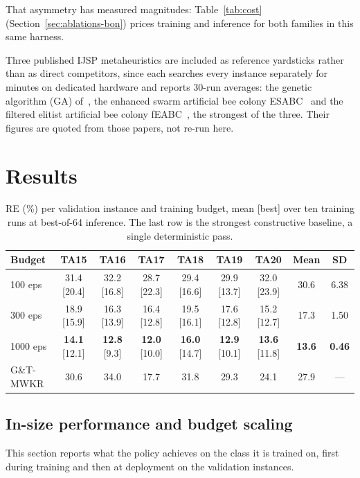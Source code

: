 \documentclass[preprint,12pt]{elsarticle}
\theoremstyle{definition}
\theoremstyle{remark}
\begin{document}
That asymmetry has measured magnitudes: Table~\ref{tab:cost}
(Section~\ref{sec:ablations-bon}) prices training and inference for
both families in this same harness.

Three published IJSP metaheuristics are included as reference
yardsticks rather than as direct competitors, since each searches
every instance separately for minutes on dedicated hardware and
reports 30-run averages: the genetic algorithm (GA)
of~\citet{DiazGA2020}, the enhanced swarm artificial bee colony
ESABC~\citep{DiazICAE2023} and the filtered elitist artificial bee
colony fEABC~\citep{DiazFEABC2023}, the strongest of the three. Their
figures are quoted from those papers, not re-run here.

\section{Results}
\label{sec:results}

\begin{table}[t]
\centering\small
\caption{RE (\%) per validation instance and training budget, mean
[best] over ten training runs at best-of-64 inference. The last row
is the strongest constructive baseline, a single deterministic pass.}
\label{tab:insize}
\footnotesize
\setlength{\tabcolsep}{3.5pt}
\begin{tabular}{lcccccccc}
\toprule
Budget & TA15 & TA16 & TA17 & TA18 & TA19 & TA20 & Mean & SD \\
\midrule
100 eps & 31.4 [20.4] & 32.2 [16.8] & 28.7 [22.3] & 29.4 [16.6] &
29.9 [13.7] & 32.0 [23.9] & 30.6 & 6.38 \\
300 eps & 18.9 [15.9] & 16.3 [13.9] & 16.4 [12.8] & 19.5 [16.1] &
17.6 [12.8] & 15.2 [12.7] & 17.3 & 1.50 \\
1000 eps & \textbf{14.1} [12.1] & \textbf{12.8} [9.3] &
\textbf{12.0} [10.0] & \textbf{16.0} [14.7] & \textbf{12.9} [10.1] &
\textbf{13.6} [11.8] & \textbf{13.6} & \textbf{0.46} \\
\midrule
G\&T-MWKR & 30.6 & 34.0 & 17.7 & 31.8 & 29.3 & 24.1 & 27.9 & --- \\
\bottomrule
\end{tabular}
\end{table}

\subsection{In-size performance and budget scaling}
\label{sec:results-insize}

This section reports what the policy achieves on the class it is
trained on, first during training and then at deployment on the
validation instances.
\end{document}
